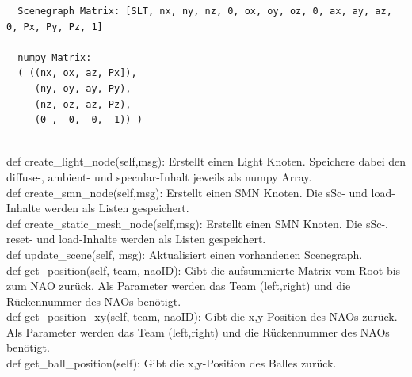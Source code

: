 \begin{verbatim}  Scenegraph Matrix: [SLT, nx, ny, nz, 0, ox, oy, oz, 0, ax, ay, az, 0, Px, Py, Pz, 1]
 
  numpy Matrix:
  ( ((nx, ox, az, Px]),
     (ny, oy, ay, Py),
     (nz, oz, az, Pz),
     (0 ,  0,  0,  1)) )
    
\end{verbatim}
def create\_light\_node(self,msg): Erstellt einen Light Knoten. 
Speichere dabei den diffuse-, ambient- und specular-Inhalt jeweils als 
numpy Array.\\
def create\_smn\_node(self,msg): Erstellt einen SMN Knoten. Die sSc- und load-Inhalte werden als Listen gespeichert.\\
def create\_static\_mesh\_node(self,msg): Erstellt einen SMN Knoten.
 Die sSc-, reset- und load-Inhalte werden als Listen gespeichert.\\
def update\_scene(self, msg): Aktualisiert einen vorhandenen Scenegraph.\\
def get\_position(self, team, naoID): Gibt die aufsummierte Matrix
 vom Root bis zum NAO zurück. Als Parameter werden das Team (left,right)
 und die Rückennummer des NAOs benötigt.\\
def get\_position\_xy(self, team, naoID): Gibt die x,y-Position des
 NAOs zurück. Als Parameter werden das Team (left,right) und die 
Rückennummer des NAOs benötigt.\\
def get\_ball\_position(self): Gibt die x,y-Position des Balles zurück.
